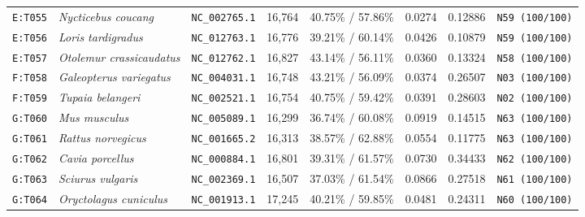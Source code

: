 \documentclass[10pt,letterpaper]{article}
\begin{document}
\begin{longtable}{llllllll}
\texttt{E:T055} & \textit{Nycticebus coucang} & \texttt{NC\_002765.1} & 16,764 & 40.75\% / 57.86\% & 0.0274 & 0.12886 & \texttt{N59 (100/100)} \\
\texttt{E:T056} & \textit{Loris tardigradus} & \texttt{NC\_012763.1} & 16,776 & 39.21\% / 60.14\% & 0.0426 & 0.10879 & \texttt{N59 (100/100)} \\
\texttt{E:T057} & \textit{Otolemur crassicaudatus} & \texttt{NC\_012762.1} & 16,827 & 43.14\% / 56.11\% & 0.0360 & 0.13324 & \texttt{N58 (100/100)} \\
\texttt{F:T058} & \textit{Galeopterus variegatus} & \texttt{NC\_004031.1} & 16,748 & 43.21\% / 56.09\% & 0.0374 & 0.26507 & \texttt{N03 (100/100)} \\
\texttt{F:T059} & \textit{Tupaia belangeri} & \texttt{NC\_002521.1} & 16,754 & 40.75\% / 59.42\% & 0.0391 & 0.28603 & \texttt{N02 (100/100)} \\
\texttt{G:T060} & \textit{Mus musculus} & \texttt{NC\_005089.1} & 16,299 & 36.74\% / 60.08\% & 0.0919 & 0.14515 & \texttt{N63 (100/100)} \\
\texttt{G:T061} & \textit{Rattus norvegicus} & \texttt{NC\_001665.2} & 16,313 & 38.57\% / 62.88\% & 0.0554 & 0.11775 & \texttt{N63 (100/100)} \\
\texttt{G:T062} & \textit{Cavia porcellus} & \texttt{NC\_000884.1} & 16,801 & 39.31\% / 61.57\% & 0.0730 & 0.34433 & \texttt{N62 (100/100)} \\
\texttt{G:T063} & \textit{Sciurus vulgaris} & \texttt{NC\_002369.1} & 16,507 & 37.03\% / 61.54\% & 0.0866 & 0.27518 & \texttt{N61 (100/100)} \\
\texttt{G:T064} & \textit{Oryctolagus cuniculus} & \texttt{NC\_001913.1} & 17,245 & 40.21\% / 59.85\% & 0.0481 & 0.24311 & \texttt{N60 (100/100)} \\
\bottomrule
\end{longtable}
\end{document}
